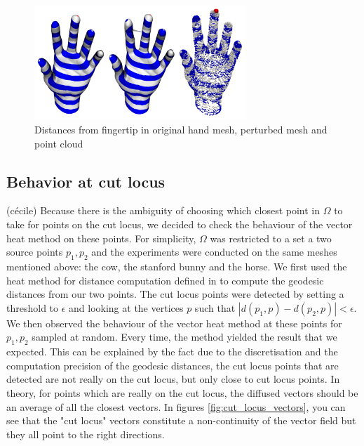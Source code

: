 \documentclass[sigconf]{acmart}
\begin{document}
\begin{figure}
  \centering
  \includegraphics[width=8cm]{hands_distances.png}
  \caption{Distances from fingertip in original hand mesh, perturbed mesh and point cloud}
  \label{fig:hand_distances}
\end{figure}

\subsection{Behavior at cut locus}
(cécile)
Because there is the ambiguity of choosing which closest point in $\Omega$ to take for points on the cut locus, we decided to check 
the behaviour of the vector heat method on these points. For simplicity, $\Omega$ was restricted to a set a two source points $p_1, p_2$ and 
the experiments were conducted on the same meshes mentioned above: the cow, the stanford bunny and the horse. We first used the heat method for 
distance computation defined in \cite{crane_geodesics_2013} to compute the geodesic distances from our two points. The cut locus
points were detected by setting a threshold to $\epsilon$ and looking at the vertices $p$ such that $|d(p_1, p) - d(p_2, p)|<\epsilon$. We then 
observed the behaviour of the vector heat method at these points for $p_1, p_2$ sampled at random. Every time, the method yielded the result that 
we expected. This can be explained by the fact due to the discretisation and the computation precision of the geodesic distances, the cut locus 
points that are detected are not really on the cut locus, but only close to cut locus points. In theory, for points which are really on the cut 
locus, the diffused vectors should be an average of all the closest vectors. In figures \ref{fig:cut_locus_vectors}, you can see that
the "cut locus" vectors constitute a non-continuity of the vector field but they all point to the right directions. 
\end{document}

